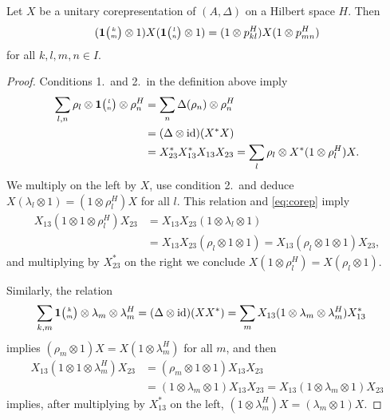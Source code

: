 \begin{Lem} \label{lem:corep-intertwine}
 Let $X$ be a unitary corepresentation of $(A,\Delta)$ on a Hilbert space $H$. Then  
    \begin{align*}
      (\mathbf{1}{\tiny {\begin{pmatrix} k\\m\end{pmatrix}}} \otimes 1)X(\mathbf{1}{\tiny {\begin{pmatrix} l\\n\end{pmatrix}}} \otimes 1) = (1 \otimes p^{H}_{kl})X(1 \otimes
      p^{H}_{mn})
    \end{align*}
   for all $k,l,m,n \in I$.
\end{Lem}
\begin{proof}
 Conditions 1.\ and 2.\ in the definition above imply
  \begin{align*}
 \sum_{l,n} \rho_{l} \otimes
  \mathbf{1}{\tiny {\begin{pmatrix} l\\n\end{pmatrix}}} \otimes \rho_{n}^{H} &=
    \sum_{n} \Delta(\rho_{n}) \otimes \rho_{n}^{H} \\ &= (\Delta \otimes
    \operatorname{id})(X^{*}X) \\ &= X^{*}_{23}X^{*}_{13}X_{13}X_{23}  =
    \sum_{l}\rho_{l} \otimes X^{*}(1 \otimes \rho_{l}^{H})X.
  \end{align*}
  We multiply on the left by $X$, use  condition 2.\, and deduce
  $X(\lambda_{l}\otimes 1)=(1\otimes \rho_{l}^{H})X$ for all $l$.
  This relation and \eqref{eq:corep} imply
 \begin{align*}
   X_{13}(1\otimes 1 \otimes \rho_{l}^{H})X_{23} &=X_{13}X_{23}(1
   \otimes \lambda_{l} \otimes 1) \\ &= X_{13}X_{23}(\rho_{l} \otimes 1
   \otimes 1) = X_{13} (\rho_{l} \otimes 1
   \otimes 1) X_{23},
 \end{align*}
 and multiplying by $X_{23}^{*}$ on the right we conclude $X(1\otimes
 \rho^{H}_{l})=X(\rho_{l} \otimes 1)$.


  Similarly,  the relation
  \begin{align*}
    \sum_{k,m} \mathbf{1}{\tiny {\begin{pmatrix} k\\m\end{pmatrix}}} \otimes \lambda_{m} \otimes
    \lambda_{m}^{H} &= (\Delta \otimes \operatorname{id})(XX^{*}) = \sum_{m}
    X_{13}(1 \otimes \lambda_{m} \otimes \lambda_{m}^{H})X_{13}^{*}
  \end{align*}
  implies $(\rho_{m} \otimes 1)X=X(1\otimes \lambda^{H}_{m})$ for all
  $m$, and then
  \begin{align*}
    X_{13}(1 \otimes 1 \otimes \lambda^{H}_{m})X_{23} &= (
    \rho_{m} \otimes 1 \otimes 1)X_{13}X_{23} \\ &= (1\otimes
    \lambda_{m}\otimes 1)X_{13}X_{23} = X_{13}(1 \otimes \lambda_{m}
    \otimes 1)X_{23}
  \end{align*}
  implies, after multiplying by $X_{13}^{*}$ on the left, $(1 \otimes
  \lambda_{m}^{H})X=(\lambda_{m} \otimes 1)X$.
\end{proof}

